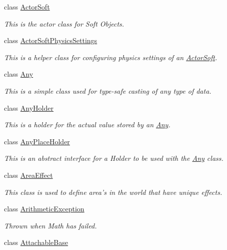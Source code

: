 \begin{DoxyCompactItemize}
class \hyperlink{classMezzanine_1_1ActorSoft}{Actor\-Soft}
\begin{DoxyCompactList}\small\item\em This is the actor class for Soft Objects. \end{DoxyCompactList}\item 
class \hyperlink{classMezzanine_1_1ActorSoftPhysicsSettings}{Actor\-Soft\-Physics\-Settings}
\begin{DoxyCompactList}\small\item\em This is a helper class for configuring physics settings of an \hyperlink{classMezzanine_1_1ActorSoft}{Actor\-Soft}. \end{DoxyCompactList}\item 
class \hyperlink{classMezzanine_1_1Any}{Any}
\begin{DoxyCompactList}\small\item\em This is a simple class used for type-\/safe casting of any type of data. \end{DoxyCompactList}\item 
class \hyperlink{classMezzanine_1_1AnyHolder}{Any\-Holder}
\begin{DoxyCompactList}\small\item\em This is a holder for the actual value stored by an \hyperlink{classMezzanine_1_1Any}{Any}. \end{DoxyCompactList}\item 
class \hyperlink{classMezzanine_1_1AnyPlaceHolder}{Any\-Place\-Holder}
\begin{DoxyCompactList}\small\item\em This is an abstract interface for a Holder to be used with the \hyperlink{classMezzanine_1_1Any}{Any} class. \end{DoxyCompactList}\item 
class \hyperlink{classMezzanine_1_1AreaEffect}{Area\-Effect}
\begin{DoxyCompactList}\small\item\em This class is used to define area's in the world that have unique effects. \end{DoxyCompactList}\item 
class \hyperlink{classMezzanine_1_1ArithmeticException}{Arithmetic\-Exception}
\begin{DoxyCompactList}\small\item\em Thrown when Math has failed. \end{DoxyCompactList}\item 
class \hyperlink{classMezzanine_1_1AttachableBase}{Attachable\-Base}

\end{DoxyCompactItemize}
